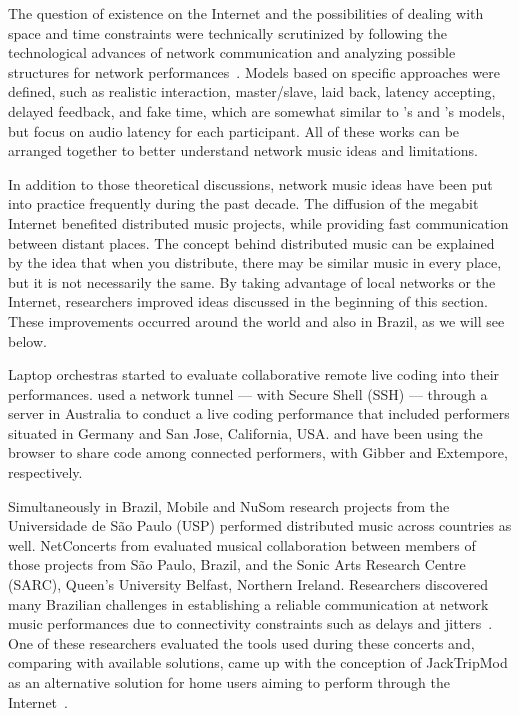 The question of existence on the Internet and the possibilities of dealing with space and time constraints were technically scrutinized by following the technological advances of network communication and analyzing possible structures for network performances~\citep{Carot2007network,Carot2007networked,Carot2008distributed,Carot2009fundamentals,Carot2010low}.
Models based on specific approaches were defined, such as realistic interaction, master/slave, laid back, latency accepting, delayed feedback, and fake time, which are somewhat similar to 's and 's models, but focus on audio latency for each participant.
All of these works can be arranged together to better understand network music ideas and limitations. 

In addition to those theoretical discussions, network music ideas have been put into practice frequently during the past decade.
The diffusion of the megabit Internet benefited distributed music projects, while providing fast communication between distant places.
The concept behind distributed music can be explained by the idea that when you distribute, there may be similar music in every place, but it is not necessarily the same.
By taking advantage of local networks or the Internet, researchers improved ideas discussed in the beginning of this section.
These improvements occurred around the world and also in Brazil, as we will see below.

Laptop orchestras started to evaluate collaborative remote live coding into their performances.
\cite{Swift2014networked} used a network tunnel --- with Secure Shell (SSH) --- through a server in Australia to conduct a live coding performance that included performers situated in Germany and San Jose, California, USA.
\cite{Roberts2012gibberlivecoding} and \cite{Ogborn2014live} have been using the browser to share code among connected performers, with Gibber and Extempore, respectively.

Simultaneously in Brazil, Mobile and NuSom research projects from the Universidade de São Paulo (USP) performed distributed music across countries as well.
NetConcerts from \citep{Arango2014thesis} evaluated musical collaboration between members of those projects from São Paulo, Brazil, and the Sonic Arts Research Centre (SARC), Queen's University Belfast, Northern Ireland.
Researchers discovered many Brazilian challenges in establishing a reliable communication at network music performances due to connectivity constraints such as delays and jitters~\citep{Arango2013challenges,Arango2014thesis}.
One of these researchers evaluated the tools used during these concerts and, comparing with available solutions, came up with the conception of JackTripMod as an alternative solution for home users aiming to perform through the Internet~\citep{Tomiyoshi2013thesis}.

